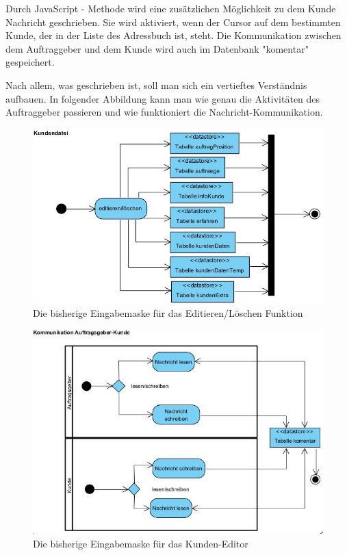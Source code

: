 Durch JavaScript - Methode wird eine zusätzlichen Möglichkeit zu dem Kunde Nachricht geschrieben. Sie wird aktiviert, wenn der Cursor auf dem bestimmten Kunde, der in der Liste des Adressbuch ist, steht. Die Kommunikation zwischen dem Auftraggeber und dem  Kunde wird auch im Datenbank "komentar" gespeichert. 

Nach allem, was geschrieben ist, soll man sich ein vertieftes Verständnis aufbauen. In folgender Abbildung kann man wie genau die Aktivitäten des Auftraggeber passieren und wie funktioniert die Nachricht-Kommunikation.
\pagebreak


\begin{figure}[h]
	\centering
	\includegraphics[width=0.7\linewidth, height=0.5\linewidth]{Graphics/Kundendatei.JPG}
	\caption[Kundeansicht]{Die bisherige Eingabemaske für das Editieren/Löschen Funktion}
	\label{fig:Kunden Datei Editieren und Löschen}
\end{figure}

\begin{figure}[h]
	\centering
	\includegraphics[width=0.7\linewidth, height=0.6\linewidth]{Graphics/Kommunikation.JPG}
	\caption[Kundeansicht]{Die bisherige Eingabemaske für das Kunden-Editor}
	\label{fig:Kommunikation Auftraggeber Kunde}
\end{figure}

